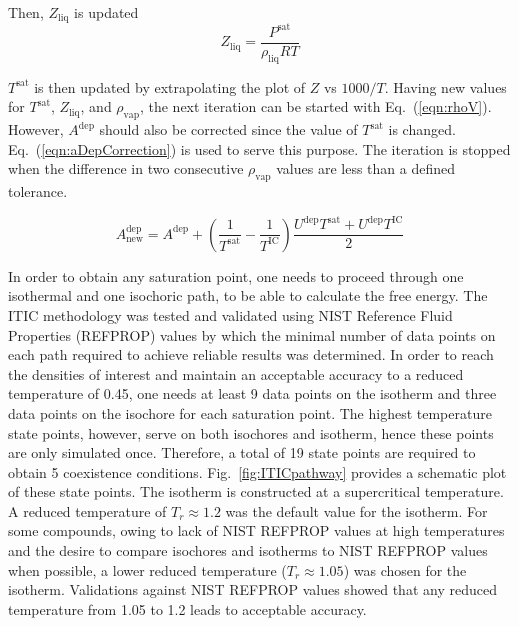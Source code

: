 \documentclass[5p,times]{elsarticle}
\begin{document}
Then, $Z_\mathrm{liq}$ is updated 
\begin{equation}
{Z_{\mathrm{liq}}} = \frac{P^\mathrm{sat}}{\rho_\mathrm{liq}RT}  
\label{eqn:zliq}
\end{equation}

$T^\mathrm{sat}$ is then updated by extrapolating the plot of $Z$ vs $1000/T$. Having new values for $T^\mathrm{sat}$, $Z_{\mathrm{liq}}$, and $\rho_\mathrm{vap}$, the next iteration can be started with Eq.~(\ref{eqn:rhoV}). However, $A^\mathrm{dep}$ should also be corrected since the value of $T^\mathrm{sat}$ is changed. Eq.~(\ref{eqn:aDepCorrection}) is used to serve this purpose. The iteration is stopped when the difference in two consecutive $\rho_\mathrm{vap}$ values are less than a defined tolerance. 

\begin{equation}
A^\mathrm{dep}_\mathrm{new} = A^\mathrm{dep} + \left( \frac{1}{T^\mathrm{sat}}-\frac{1}{T^\mathrm{IC}} \right) \frac{U^\mathrm{dep}T^\mathrm{sat}+U^\mathrm{dep}T^\mathrm{IC}}{2} 
\label{eqn:aDepCorrection}
\end{equation}

In order to obtain any saturation point, one needs to proceed through one isothermal and one isochoric path, to be able to calculate the free energy. The ITIC methodology was tested and validated using NIST Reference Fluid Properties (REFPROP) \cite{LEMMON-RP91} values by which the minimal number of data points on each path required to achieve reliable results was determined. In order to reach the densities of interest and maintain an acceptable accuracy to a reduced temperature of 0.45, one needs at least 9 data points on the isotherm and three data points on the isochore for each saturation point. The highest temperature state points, however, serve on both isochores and isotherm, hence these points are only simulated once. Therefore, a total of 19 state points are required to obtain 5 coexistence conditions. Fig.~\ref{fig:ITICpathway} provides a schematic plot of these state points. The isotherm is constructed at a supercritical temperature. A reduced temperature of $T_{r} \approx 1.2$ was the default value for the isotherm. For some compounds, owing to lack of NIST REFPROP values at high temperatures and the desire to compare isochores and isotherms to NIST REFPROP values when possible, a lower reduced temperature ($T_{r} \approx 1.05$) was chosen for the isotherm. Validations against NIST REFPROP values showed that any reduced temperature from 1.05 to 1.2 leads to acceptable accuracy.
\end{document}
